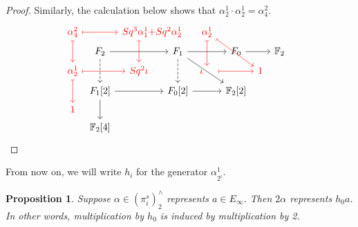 \documentclass[11pt, titlepage]{article} %
\def\bb{\ensuremath\mathbb}
\def\textcolour{\textcolor}
\numberwithin{equation}{subsection}
\theoremstyle{plain}
\newtheorem{proposition}[theorem]{Proposition}
\theoremstyle{definition}
\begin{document}
\begin{proof}
Similarly, the calculation below shows that \(\alpha^1_2\cdot \alpha^1_2=\alpha^2_4\).
\[\begin{tikzcd}[row sep = 0.8ex, column sep=0.8ex]
\textcolour{red}{\alpha^2_4} \arrow[rr, "", mapsto, red] \arrow[dd, swap, "", red, mapsto]  & & \textcolour{red}{Sq^3\alpha^1_1}\textcolour{red}{+}\mathrlap{\textcolour{red}{Sq^2\alpha^1_2}}  \arrow[dd, ""', red, mapsto] & & \textcolour{red}{\alpha^{1}_{2}}  \arrow[dd, ""', red, mapsto] \arrow[rrdd, "", red, mapsto] & && \\
& F_2 \arrow[rr, swap, ""] \arrow[dd, ""', dashrightarrow] & & F_{1} \arrow[dd, ""', dashrightarrow] \arrow[rr, ""'] \arrow[rrdd] & & F_0 \arrow[rr] && \bb{F}_2 \\
\textcolour{red}{\alpha^1_2} \arrow[rr, swap, "", red, mapsto] \arrow[dd, ""', red, mapsto] & & \textcolour{red}{Sq^2\iota} & & \textcolour{red}{\iota}\;\;\;\; \arrow[rr, ""', red, mapsto] & & \textcolour{red}{1} & & & \\
& F_1[2] \arrow[rr, swap, ""] \arrow[dd, ""'] & & F_0[2] \arrow[rr, ""'] & & \bb{F}_2[2] & &\\
\textcolour{red}{1} & &&&&&&\\
& \bb{F}_2[4] &&&&&&
\end{tikzcd}\]
\end{proof}

From now on, we will write \(h_i\) for the generator \(\alpha^1_{2^i}\).

\begin{proposition}
Suppose \(\alpha \in (\pi_i^s)^\wedge_2\) represents \(a \in E_\infty\). Then \(2\alpha\) represents \(h_0a\). In other words, multiplication by \(h_0\) is induced by multiplication by 2. 
\end{proposition}
\end{document}
